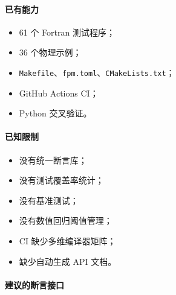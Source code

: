\documentclass[
]{ctexbook}
\providecommand{\tightlist}{%
  \setlength{\itemsep}{0pt}\setlength{\parskip}{0pt}}
\begin{document}
\hypertarget{ux5df2ux6709ux80fdux529b-7}{%
\paragraph{已有能力}\label{ux5df2ux6709ux80fdux529b-7}}

\begin{itemize}
\tightlist
\item
  61 个 Fortran 测试程序；
\item
  36 个物理示例；
\item
  \texttt{Makefile}、\texttt{fpm.toml}、\texttt{CMakeLists.txt}；
\item
  GitHub Actions CI；
\item
  Python 交叉验证。
\end{itemize}

\hypertarget{ux5df2ux77e5ux9650ux5236-7}{%
\paragraph{已知限制}\label{ux5df2ux77e5ux9650ux5236-7}}

\begin{itemize}
\tightlist
\item
  没有统一断言库；
\item
  没有测试覆盖率统计；
\item
  没有基准测试；
\item
  没有数值回归阈值管理；
\item
  CI 缺少多维编译器矩阵；
\item
  缺少自动生成 API 文档。
\end{itemize}

\hypertarget{ux5efaux8baeux7684ux65adux8a00ux63a5ux53e3}{%
\paragraph{建议的断言接口}\label{ux5efaux8baeux7684ux65adux8a00ux63a5ux53e3}}
\end{document}
